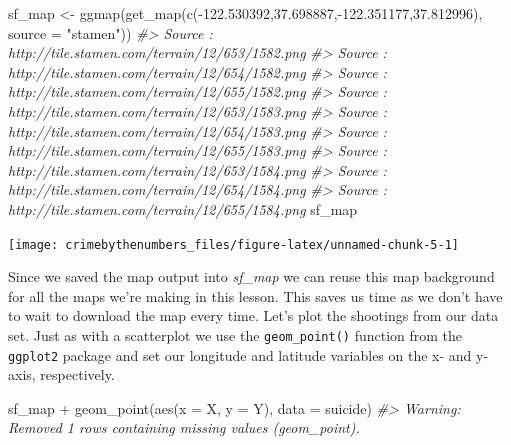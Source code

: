 \documentclass[
  12pt,
]{book}
\newenvironment{Shaded}{\begin{snugshade}}{\end{snugshade}}
\newcommand{\AttributeTok}[1]{\textcolor[rgb]{0.61,0.61,0.61}{#1}}
\newcommand{\CommentTok}[1]{\textcolor[rgb]{0.37,0.37,0.37}{\textit{#1}}}
\newcommand{\FloatTok}[1]{\textcolor[rgb]{0.06,0.06,0.06}{#1}}
\newcommand{\FunctionTok}[1]{\textcolor[rgb]{0,0,0}{#1}}
\newcommand{\NormalTok}[1]{#1}
\newcommand{\OtherTok}[1]{\textcolor[rgb]{0.37,0.37,0.37}{#1}}
\newcommand{\SpecialCharTok}[1]{\textcolor[rgb]{0,0,0}{#1}}
\newcommand{\StringTok}[1]{\textcolor[rgb]{0.5,0.5,0.5}{#1}}
\begin{document}
\begin{Shaded}
\begin{Highlighting}[]
\NormalTok{sf\_map }\OtherTok{\textless{}{-}} \FunctionTok{ggmap}\NormalTok{(}\FunctionTok{get\_map}\NormalTok{(}\FunctionTok{c}\NormalTok{(}\SpecialCharTok{{-}}\FloatTok{122.530392}\NormalTok{,}\FloatTok{37.698887}\NormalTok{,}\SpecialCharTok{{-}}\FloatTok{122.351177}\NormalTok{,}\FloatTok{37.812996}\NormalTok{), }
                            \AttributeTok{source =} \StringTok{"stamen"}\NormalTok{))}
\CommentTok{\#\textgreater{} Source : http://tile.stamen.com/terrain/12/653/1582.png}
\CommentTok{\#\textgreater{} Source : http://tile.stamen.com/terrain/12/654/1582.png}
\CommentTok{\#\textgreater{} Source : http://tile.stamen.com/terrain/12/655/1582.png}
\CommentTok{\#\textgreater{} Source : http://tile.stamen.com/terrain/12/653/1583.png}
\CommentTok{\#\textgreater{} Source : http://tile.stamen.com/terrain/12/654/1583.png}
\CommentTok{\#\textgreater{} Source : http://tile.stamen.com/terrain/12/655/1583.png}
\CommentTok{\#\textgreater{} Source : http://tile.stamen.com/terrain/12/653/1584.png}
\CommentTok{\#\textgreater{} Source : http://tile.stamen.com/terrain/12/654/1584.png}
\CommentTok{\#\textgreater{} Source : http://tile.stamen.com/terrain/12/655/1584.png}
\NormalTok{sf\_map}
\end{Highlighting}
\end{Shaded}

\begin{center}\texttt{[image: crimebythenumbers\_files/figure-latex/unnamed-chunk-5-1]} \end{center}

Since we saved the map output into \emph{sf\_map} we can reuse this map background for all the maps we're making in this lesson. This saves us time as we don't have to wait to download the map every time. Let's plot the shootings from our data set. Just as with a scatterplot we use the \texttt{geom\_point()} function from the \texttt{ggplot2} package and set our longitude and latitude variables on the x- and y-axis, respectively.

\begin{Shaded}
\begin{Highlighting}[]
\NormalTok{sf\_map }\SpecialCharTok{+}
  \FunctionTok{geom\_point}\NormalTok{(}\FunctionTok{aes}\NormalTok{(}\AttributeTok{x =}\NormalTok{ X, }\AttributeTok{y =}\NormalTok{ Y),}
             \AttributeTok{data  =}\NormalTok{ suicide)}
\CommentTok{\#\textgreater{} Warning: Removed 1 rows containing missing values (geom\_point).}
\end{Highlighting}
\end{Shaded}
\end{document}
